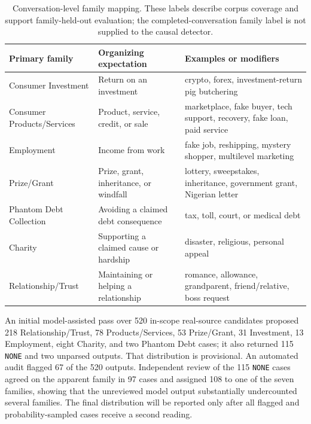 \documentclass[letterpaper,11pt]{article}
\begin{document}
\begin{table}[tb]
\centering\small
\begin{tabularx}{\linewidth}{@{}p{.28\linewidth}XX@{}}
\toprule
Primary family & Organizing expectation & Examples or modifiers \\
\midrule
Consumer Investment & Return on an investment & crypto, forex, investment-return pig butchering \\
Consumer Products/Services & Product, service, credit, or sale & marketplace, fake buyer, tech support, recovery, fake loan, paid service \\
Employment & Income from work & fake job, reshipping, mystery shopper, multilevel marketing \\
Prize/Grant & Prize, grant, inheritance, or windfall & lottery, sweepstakes, inheritance, government grant, Nigerian letter \\
Phantom Debt Collection & Avoiding a claimed debt consequence & tax, toll, court, or medical debt \\
Charity & Supporting a claimed cause or hardship & disaster, religious, personal appeal \\
Relationship/Trust & Maintaining or helping a relationship & romance, allowance, grandparent, friend/relative, boss request \\
\bottomrule
\end{tabularx}
\caption{Conversation-level family mapping. These labels describe corpus
coverage and support family-held-out evaluation; the completed-conversation
family label is not supplied to the causal detector.}
\label{tab:families}
\end{table}

An initial model-assisted pass over 520 in-scope real-source candidates proposed
218 Relationship/Trust, 78 Products/Services, 53 Prize/Grant, 31 Investment,
13 Employment, eight Charity, and two Phantom Debt cases; it also returned 115
\texttt{NONE} and two unparsed outputs. That distribution is provisional. An
automated audit flagged 67 of the 520 outputs. Independent review of the 115
\texttt{NONE} cases agreed on the apparent family in 97 cases and assigned 108 to
one of the seven families, showing that the unreviewed model output substantially
undercounted several families. The final distribution will be reported only after
all flagged and probability-sampled cases receive a second reading.
\end{document}
